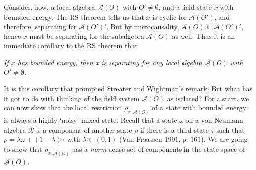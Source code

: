 \documentclass[12pt]{article}
\newcommand{\alg}[1]{\mbox{$\mathcal{#1}$}}
\begin{document}
Consider, now, a local algebra 
$\alg{A}(O)$ with $O'\not=\emptyset$, and a field state $x$ with 
bounded energy.  
The RS theorem tells us that $x$ is cyclic for 
$\alg{A}(O')$, and therefore, separating for $\alg{A}(O')'$.  But by 
microcausality, $\alg{A}(O)\subseteq\alg{A}(O')'$, hence $x$ must be 
separating for the subalgebra $\alg{A}(O)$ as well.  Thus it is an 
immediate corollary to the 
RS theorem that 
\begin{center}\emph{If $x$ has bounded energy, then x is separating for any local
        algebra $\alg{A}(O)$ with $O'\not=\emptyset$.}\end{center}
 \noindent It is this corollary that prompted Streater and Wightman's remark.  
But what has it got to do with thinking of the field system 
$\alg{A}(O)$ as isolated?
For a start, we can now show that the local restriction $\rho_{x}|_{\alg{A}(O)}$ 
of a state with bounded energy is always a highly `noisy' mixed 
state.  Recall that a state $\omega$ on a von Neumann algebra 
$\alg{R}$ is a component of another state $\rho$ if there is a third 
state $\tau$ such that $\rho=\lambda\omega+(1-\lambda)\tau$ with 
$\lambda\in (0,1)$ (Van Fraassen 1991, p. 161).  We are going 
to show that $\rho_{x}|_{\alg{A}(O)}$ has a \emph{norm} dense set of 
components in the state space of $\alg{A}(O)$.  
\end{document}
